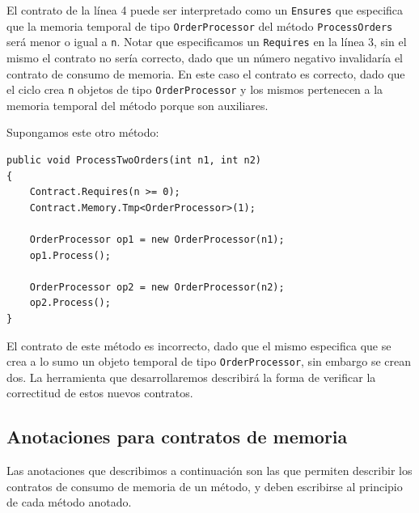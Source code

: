 \documentclass[12pt,a4paper]{article}
\newcommand\mono[1]{\texttt{#1}}
\begin{document}
			El contrato de la línea 4 puede ser interpretado como un \mono{Ensures} que especifica que la memoria temporal de tipo \mono{OrderProcessor} del método \mono{ProcessOrders} será menor o igual a \mono{n}. Notar que especificamos un \mono{Requires} en la línea 3, sin el mismo el contrato no sería correcto, dado que un número negativo invalidaría el contrato de consumo de memoria. En este caso el contrato es correcto, dado que el ciclo crea \mono{n} objetos de tipo \mono{OrderProcessor} y los mismos pertenecen a la memoria temporal del método porque son auxiliares.

			Supongamos este otro método:

			\vspace{15pt}
			\begin{lstlisting}[caption=Ejemplo de contrato de memoria temporal]
public void ProcessTwoOrders(int n1, int n2)
{
	Contract.Requires(n >= 0);
	Contract.Memory.Tmp<OrderProcessor>(1);

	OrderProcessor op1 = new OrderProcessor(n1);
	op1.Process();

	OrderProcessor op2 = new OrderProcessor(n2);
	op2.Process();
}
			\end{lstlisting}

			El contrato de este método es incorrecto, dado que el mismo especifica que se crea a lo sumo un objeto temporal de tipo \mono{OrderProcessor}, sin embargo se crean dos. La herramienta que desarrollaremos describirá la forma de verificar la correctitud de estos nuevos contratos.

		\subsection{Anotaciones para contratos de memoria}
			Las anotaciones que describimos a continuación son las que permiten describir los contratos de consumo de memoria de un método, y deben escribirse al principio de cada método anotado.
\end{document}

